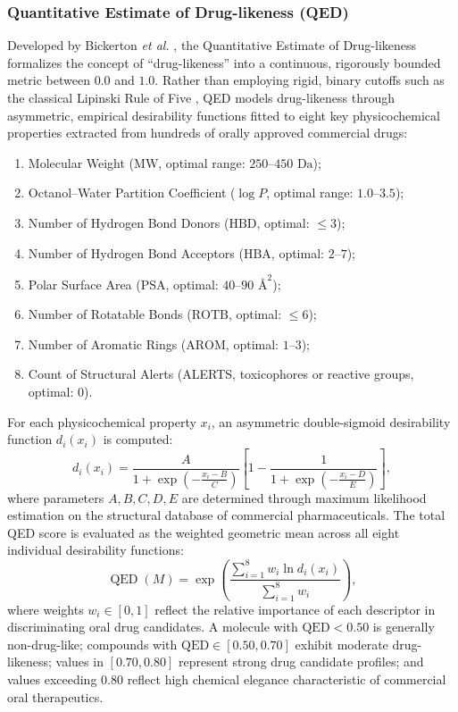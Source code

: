 \documentclass{ieeeaccess}
\begin{document}
\subsubsection{Quantitative Estimate of Drug-likeness (QED)}
Developed by Bickerton \emph{et al.} \cite{bickerton2012}, the Quantitative Estimate of Drug-likeness formalizes the concept of ``drug-likeness'' into a continuous, rigorously bounded metric between $0.0$ and $1.0$. Rather than employing rigid, binary cutoffs such as the classical Lipinski Rule of Five \cite{lipinski2001}, QED models drug-likeness through asymmetric, empirical desirability functions fitted to eight key physicochemical properties extracted from hundreds of orally approved commercial drugs:
\begin{enumerate}
    \item Molecular Weight ($\text{MW}$, optimal range: $250$--$450\text{ Da}$);
    \item Octanol--Water Partition Coefficient ($\log P$, optimal range: $1.0$--$3.5$);
    \item Number of Hydrogen Bond Donors ($\text{HBD}$, optimal: $\le 3$);
    \item Number of Hydrogen Bond Acceptors ($\text{HBA}$, optimal: $2$--$7$);
    \item Polar Surface Area ($\text{PSA}$, optimal: $40$--$90\text{ \AA}^2$);
    \item Number of Rotatable Bonds ($\text{ROTB}$, optimal: $\le 6$);
    \item Number of Aromatic Rings ($\text{AROM}$, optimal: $1$--$3$);
    \item Count of Structural Alerts (ALERTS, toxicophores or reactive groups, optimal: $0$).
\end{enumerate}
For each physicochemical property $x_i$, an asymmetric double-sigmoid desirability function $d_i(x_i)$ is computed:
\begin{equation}
d_i(x_i) = \frac{A}{1 + \exp\left(-\frac{x_i - B}{C}\right)} \left[ 1 - \frac{1}{1 + \exp\left(-\frac{x_i - D}{E}\right)} \right],
\label{eq:desirability}
\end{equation}
where parameters $A, B, C, D, E$ are determined through maximum likelihood estimation on the structural database of commercial pharmaceuticals. The total QED score is evaluated as the weighted geometric mean across all eight individual desirability functions:
\begin{equation}
\operatorname{QED}(M) = \exp\left( \frac{\sum_{i=1}^8 w_i \ln d_i(x_i)}{\sum_{i=1}^8 w_i} \right),
\label{eq:qed_total}
\end{equation}
where weights $w_i \in [0, 1]$ reflect the relative importance of each descriptor in discriminating oral drug candidates. A molecule with $\text{QED} < 0.50$ is generally non-drug-like; compounds with $\text{QED} \in [0.50, 0.70]$ exhibit moderate drug-likeness; values in $[0.70, 0.80]$ represent strong drug candidate profiles; and values exceeding $0.80$ reflect high chemical elegance characteristic of commercial oral therapeutics.
\end{document}
